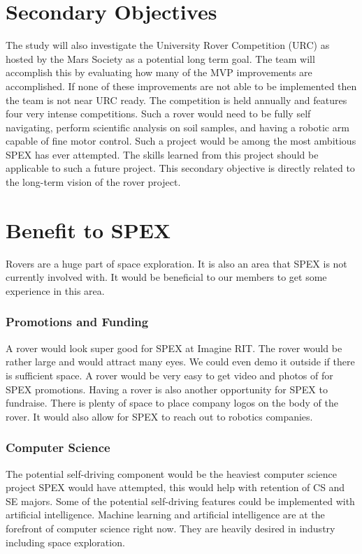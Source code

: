 \documentclass[conference]{IEEEtran} %
\begin{document}
\section{Secondary Objectives}
\label{sec:secondary-obj}
The study will also investigate the University Rover Competition (URC) as hosted by the Mars Society as a potential long term goal. 
The team will accomplish this by evaluating how many of the MVP improvements are accomplished. 
If none of these improvements are not able to be implemented then the team is not near URC ready.
The competition is held annually and features four very intense competitions. 
Such a rover would need to be fully self navigating, perform scientific analysis on soil samples, and having a robotic arm capable of fine motor control. 
Such a project would be among the most ambitious SPEX has ever attempted. The skills learned from this project should be applicable to such a future project. 
This secondary objective is directly related to the long-term vision of the rover project. 

\section{Benefit to SPEX}
\label{sec:benefit}

Rovers are a huge part of space exploration. 
It is also an area that SPEX is not currently involved with. 
It would be beneficial to our members to get some experience in this area.
\subsubsection{Promotions and Funding}
A rover would look super good for SPEX at Imagine RIT. 
The rover would be rather large and would attract many eyes. We could even demo it outside if there is sufficient space. 
A rover would be very easy to get video and photos of for SPEX promotions. 
Having a rover is also another opportunity for SPEX to fundraise. 
There is plenty of space to place company logos on the body of the rover. 
It would also allow for SPEX to reach out to robotics companies.
\subsubsection{Computer Science}
The potential self-driving component would be the heaviest computer science project SPEX would have attempted, this would help with retention of CS and SE majors. 
Some of the potential self-driving features could be implemented with artificial intelligence.
Machine learning and artificial intelligence are at the forefront of computer science right now. 
They are heavily desired in industry including space exploration.
\end{document}
